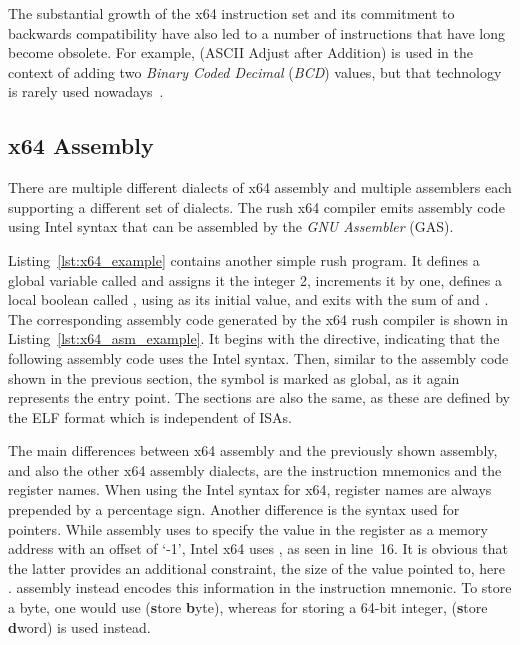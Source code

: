 The substantial growth of the x64 instruction set and its commitment to backwards compatibility have also led to a number of instructions that have long become obsolete.
For example,  (ASCII Adjust after Addition) is used in the context of adding two \emph{Binary Coded Decimal} (\emph{BCD}) values, but that technology is rarely used nowadays~\cite[p.~4]{Patterson2017}.

\subsection{x64 Assembly}


There are multiple different dialects of x64 assembly and multiple assemblers each supporting a different set of dialects.
The rush x64 compiler emits assembly code using Intel syntax that can be assembled by the \emph{GNU Assembler} (GAS).

Listing~\ref{lst:x64_example} contains another simple rush program.
It defines a global variable called  and assigns it the integer 2, increments it by one, defines a local boolean called , using  as its initial value, and exits with the sum of  and .
The corresponding assembly code generated by the x64 rush compiler is shown in Listing~\ref{lst:x64_asm_example}.
It begins with the  directive, indicating that the following assembly code uses the Intel syntax.
Then, similar to the \riscv{} assembly code shown in the previous section, the  symbol is marked as global, as it again represents the entry point.
The sections are also the same, as these are defined by the ELF format which is independent of ISAs.


The main differences between x64 assembly and the previously shown \riscv{} assembly, and also the other x64 assembly dialects, are the instruction mnemonics and the register names.
When using the Intel syntax for x64, register names are always prepended by a percentage sign.
Another difference is the syntax used for pointers.
While \riscv{} assembly uses  to specify the value in the  register as a memory address with an offset of `-1', Intel x64 uses , as seen in line~16.
It is obvious that the latter provides an additional constraint, the size of the value pointed to, here .
\riscv{} assembly instead encodes this information in the instruction mnemonic.
To store a byte, one would use  (\textbf{s}tore \textbf{b}yte), whereas for storing a 64-bit integer,  (\textbf{s}tore \textbf{d}word) is used instead.


